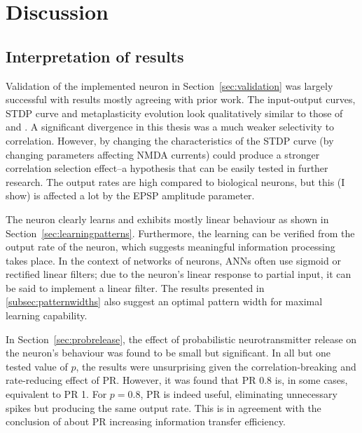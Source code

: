 \documentclass[a4paper,12pt]{report}
\theoremstyle{definition}
\begin{document}
\chapter{Discussion}

\section{Interpretation of results}

Validation of the implemented neuron in Section~\ref{sec:validation} was largely successful with results mostly agreeing with prior work. The input-output curves, STDP curve and metaplasticity evolution look qualitatively similar to those of \cite{shouval2002unified} and \cite{yeung2004synaptic}. A significant divergence in this thesis was a much weaker selectivity to correlation. However, by changing the characteristics of the STDP curve (by changing parameters affecting NMDA currents) could produce a stronger correlation selection effect--a hypothesis that can be easily tested in further research. The output rates are high compared to biological neurons, but this (I show) is affected a lot by the EPSP amplitude parameter.


The neuron clearly learns and exhibits mostly linear behaviour as shown in Section~\ref{sec:learningpatterns}. Furthermore, the learning can be verified from the output rate of the neuron, which suggests meaningful information processing takes place.
In the context of networks of neurons, ANNs often use sigmoid or rectified linear filters; due to the neuron's linear response to partial input, it can be said to implement a linear filter. The results presented in \ref{subsec:patternwidths} also suggest an optimal pattern width for maximal learning capability.


In Section~\ref{sec:probrelease}, the effect of probabilistic neurotransmitter release on the neuron's behaviour was found to be small but significant. In all but one tested value of $p$, the results were unsurprising given the correlation-breaking and rate-reducing effect of PR. However, it was found that PR 0.8 is, in some cases, equivalent to PR 1. For $p=0.8$, PR is indeed useful, eliminating unnecessary spikes but producing the same output rate. This is in agreement with the conclusion of \cite{goldman2004enhancement} about PR increasing information transfer efficiency.
\end{document}
